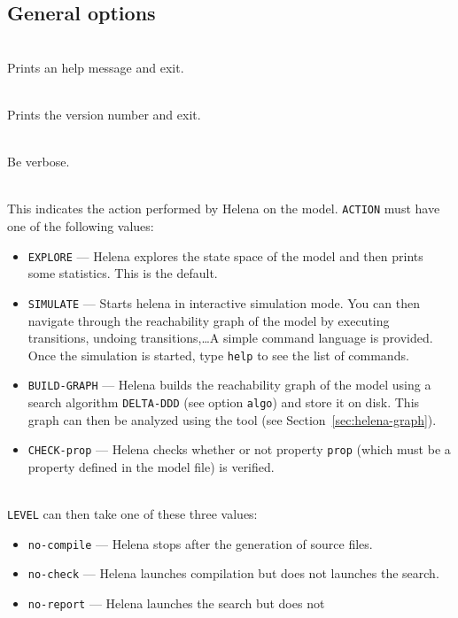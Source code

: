 \subsection{General options}
\begin{description}
\item{}\\ Prints an help message and exit.
\item{}\\ Prints the version number and exit.
\item{}\\ Be verbose.
\item{}\\
  This indicates the action performed by Helena on the model.
  \texttt{ACTION} must have one of the following values:
  \begin{itemize}
  \item\texttt{EXPLORE} --- Helena explores the state space of the
    model and then prints some statistics.  This is the default.
  \item\texttt{SIMULATE} --- Starts helena in interactive simulation
    mode.  You can then navigate through the reachability graph of the
    model by executing transitions, undoing transitions,\ldots A
    simple command language is provided.  Once the simulation is
    started, type \texttt{help} to see the list of commands.
  \item\texttt{BUILD-GRAPH} --- Helena builds the reachability graph
    of the model using a search algorithm \texttt{DELTA-DDD} (see
    option \texttt{algo}) and store it on disk.  This graph can then
    be analyzed using the  tool (see
    Section~\ref{sec:helena-graph}).
  \item\texttt{CHECK-prop} --- Helena checks whether or not property
    \texttt{prop} (which must be a property defined in the model file)
    is verified.
  \end{itemize}
\item{}\\ \texttt{LEVEL} can then take
  one of these three values:
  \begin{itemize}
  \item \texttt{no-compile} --- Helena stops after the generation of
    source files.
  \item \texttt{no-check} --- Helena launches compilation but does not
    launches the search.
  \item \texttt{no-report} --- Helena launches the search but does not

\end{itemize}
\end{description}
